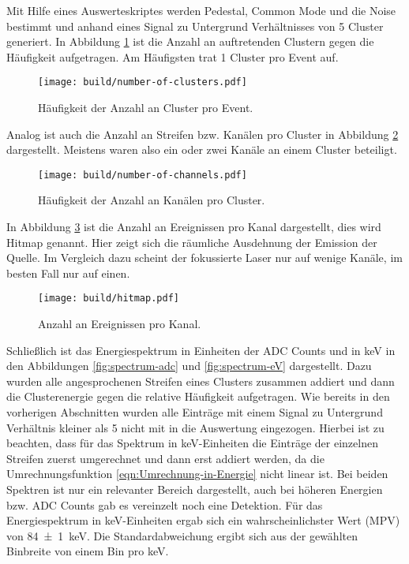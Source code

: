 Mit Hilfe eines Auswerteskriptes werden Pedestal, Common Mode und die Noise bestimmt
und anhand eines Signal zu Untergrund Verhältnisses von \num{5} Cluster generiert.
In Abbildung \ref{fig:number-of-clusters} ist die Anzahl an auftretenden Clustern gegen die
Häufigkeit aufgetragen.
Am Häufigsten trat \num{1} Cluster pro Event auf.
\begin{figure}
  \centering
  \texttt{[image: build/number-of-clusters.pdf]}  %
  \caption{Häufigkeit der Anzahl an Cluster pro Event.}
  \label{fig:number-of-clusters}
\end{figure}
Analog ist auch die Anzahl an Streifen bzw. Kanälen pro Cluster in Abbildung
\ref{fig:number-of-channels} dargestellt.
Meistens waren also ein oder zwei Kanäle an einem Cluster beteiligt.
\begin{figure}
  \centering
  \texttt{[image: build/number-of-channels.pdf]}  %
  \caption{Häufigkeit der Anzahl an Kanälen pro Cluster.}
  \label{fig:number-of-channels}
\end{figure}
In Abbildung \ref{fig:hitmap} ist die Anzahl an Ereignissen pro Kanal dargestellt,
dies wird Hitmap genannt. Hier zeigt sich die räumliche Ausdehnung der Emission der
Quelle. Im Vergleich dazu scheint der fokussierte Laser nur auf wenige Kanäle,
im besten Fall nur auf einen.
\begin{figure}
  \centering
  \texttt{[image: build/hitmap.pdf]}  %
  \caption{Anzahl an Ereignissen pro Kanal.}
  \label{fig:hitmap}
\end{figure}

Schließlich ist das Energiespektrum in Einheiten der ADC Counts und in \si{\kilo\electronvolt}
in den Abbildungen \ref{fig:spectrum-adc} und \ref{fig:spectrum-eV}
dargestellt.
Dazu wurden alle angesprochenen Streifen eines Clusters zusammen addiert und dann
die Clusterenergie gegen die relative Häufigkeit aufgetragen.
Wie bereits in den vorherigen Abschnitten wurden alle Einträge mit einem Signal zu
Untergrund Verhältnis kleiner als \num{5} nicht mit in die Auswertung eingezogen.
Hierbei ist zu beachten, dass für das Spektrum in \si{\kilo\electronvolt}-Einheiten
die Einträge der einzelnen Streifen zuerst umgerechnet und dann erst addiert werden,
da die Umrechnungsfunktion \eqref{eqn:Umrechnung-in-Energie} nicht linear ist.
Bei beiden Spektren ist nur ein relevanter Bereich dargestellt, auch bei höheren
Energien bzw. ADC Counts gab es vereinzelt noch eine Detektion.
Für das Energiespektrum in \si{\kilo\electronvolt}-Einheiten ergab sich ein
wahrscheinlichster Wert (MPV) von \SI{84(1)}{\kilo\electronvolt}.
Die Standardabweichung ergibt sich aus der gewählten Binbreite von einem Bin pro
\si{\kilo\electronvolt}.

